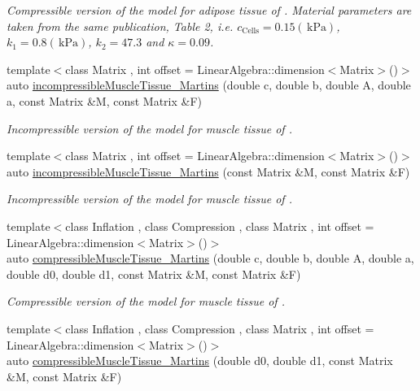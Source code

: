 \begin{DoxyCompactItemize}
\begin{DoxyCompactList}\small\item\em Compressible version of the model for adipose tissue of \cite{Sommer2013}. Material parameters are taken from the same publication, Table 2, i.\-e. $c_\mathrm{Cells}=0.15 (\,\mathrm{kPa})$, $k_1=0.8 (\,\mathrm{kPa})$, $k_2=47.3$ and $\kappa=0.09$. \end{DoxyCompactList}\item 
{\footnotesize template$<$class Matrix , int offset = Linear\-Algebra\-::dimension$<$\-Matrix$>$()$>$ }\\auto \hyperlink{group__Biomechanics_gafcc36a1958899ca9246c4c1b3c9bfd85}{incompressible\-Muscle\-Tissue\-\_\-\-Martins} (double c, double b, double A, double a, const Matrix \&M, const Matrix \&F)
\begin{DoxyCompactList}\small\item\em Incompressible version of the model for muscle tissue of \cite{Martins1998}. \end{DoxyCompactList}\item 
{\footnotesize template$<$class Matrix , int offset = Linear\-Algebra\-::dimension$<$\-Matrix$>$()$>$ }\\auto \hyperlink{group__Biomechanics_ga9e414585a90b1988e9fa88d17d875055}{incompressible\-Muscle\-Tissue\-\_\-\-Martins} (const Matrix \&M, const Matrix \&F)
\begin{DoxyCompactList}\small\item\em Incompressible version of the model for muscle tissue of \cite{Martins1998}. \end{DoxyCompactList}\item 
{\footnotesize template$<$class Inflation , class Compression , class Matrix , int offset = Linear\-Algebra\-::dimension$<$\-Matrix$>$()$>$ }\\auto \hyperlink{group__Biomechanics_gad831914c493a3da04ed40c3c0ce87a62}{compressible\-Muscle\-Tissue\-\_\-\-Martins} (double c, double b, double A, double a, double d0, double d1, const Matrix \&M, const Matrix \&F)
\begin{DoxyCompactList}\small\item\em Compressible version of the model for muscle tissue of \cite{Martins1998}. \end{DoxyCompactList}\item 
{\footnotesize template$<$class Inflation , class Compression , class Matrix , int offset = Linear\-Algebra\-::dimension$<$\-Matrix$>$()$>$ }\\auto \hyperlink{group__Biomechanics_ga46a70ccb2285e12addad87b6a8aaaae8}{compressible\-Muscle\-Tissue\-\_\-\-Martins} (double d0, double d1, const Matrix \&M, const Matrix \&F)

\end{DoxyCompactItemize}

